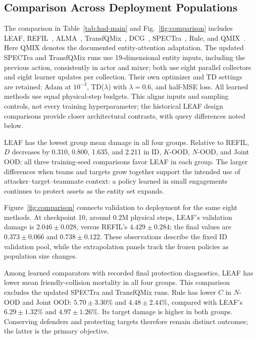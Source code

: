\subsection{Comparison Across Deployment Populations}
\label{subsec:comparison}
The comparison in Table~\ref{tab:had-main} and Fig.~\ref{fig:comparison} includes LEAF, REFIL~\cite{iqbal2021refil}, ALMA~\cite{iqbal2022alma}, TransfQMix~\cite{transfqmix2023}, DCG~\cite{boehmer2020dcg}, SPECTra~\cite{park2026spectra}, Rule, and QMIX~\cite{rashid2018qmix}. Here QMIX denotes the documented entity-attention adaptation. The updated SPECTra and TransfQMix runs use 19-dimensional entity inputs, including the previous action, consistently in actor and mixer; both use eight parallel collectors and eight learner updates per collection. Their own optimizer and TD settings are retained: Adam at $10^{-3}$, TD($\lambda$) with $\lambda=0.6$, and half-MSE loss. All learned methods use equal physical-step budgets. This aligns inputs and sampling controls, not every training hyperparameter; the historical LEAF design comparisons provide closer architectural contrasts, with query differences noted below.

LEAF has the lowest group mean damage in all four groups. Relative to REFIL, $D$ decreases by 0.310, 0.800, 1.635, and 2.211 in ID, $K$-OOD, $N$-OOD, and Joint OOD; all three training-seed comparisons favor LEAF in each group. The larger differences when teams and targets grow together support the intended use of attacker--target--teammate context: a policy learned in small engagements continues to protect assets as the entity set expands.

Figure~\ref{fig:comparison} connects validation to deployment for the same eight methods. At checkpoint 10, around 0.2M physical steps, LEAF's validation damage is $2.046\pm0.028$, versus REFIL's $4.429\pm0.284$; the final values are $0.373\pm0.066$ and $0.738\pm0.122$. These observations describe the fixed ID validation pool, while the extrapolation panels track the frozen policies as population size changes.

Among learned comparators with recorded final protection diagnostics, LEAF has lower mean friendly-collision mortality in all four groups. This comparison excludes the updated SPECTra and TransfQMix runs. Rule has lower $C$ in $N$-OOD and Joint OOD: $5.70\pm3.30\%$ and $4.48\pm2.44\%$, compared with LEAF's $6.29\pm1.32\%$ and $4.97\pm1.26\%$. Its target damage is higher in both groups. Conserving defenders and protecting targets therefore remain distinct outcomes; the latter is the primary objective.

